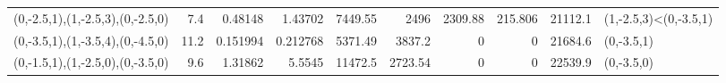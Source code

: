 \begin{tabular}{lrrrrrrrrl}
 (0,-2.5,1),(1,-2.5,3),(0,-2.5,0) &        7.4 &                          0.48148  &                        1.43702  &                           7449.55 &                         2496    &                           2309.88 &                         215.806 &   21112.1  & (1,-2.5,3)<(0,-3.5,1)            \\
 (0,-3.5,1),(1,-3.5,4),(0,-4.5,0) &       11.2 &                          0.151994 &                        0.212768 &                           5371.49 &                         3837.2  &                              0    &                           0     &   21684.6  & (0,-3.5,1)                       \\
 (0,-1.5,1),(1,-2.5,0),(0,-3.5,0) &        9.6 &                          1.31862  &                        5.5545   &                          11472.5  &                         2723.54 &                              0    &                           0     &   22539.9  & (0,-3.5,0)                       \\
\hline
\end{tabular}